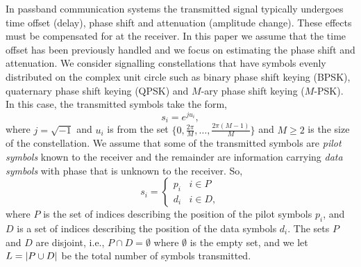 \documentclass[journal]{IEEEtran}
\begin{document}
In passband communication systems the transmitted signal typically undergoes time offset (delay), phase shift and attenuation (amplitude change).  These effects must be compensated for at the receiver. In this paper we assume that the time offset has been previously handled and we focus on estimating the phase shift and attenuation.  We consider signalling constellations that have symbols evenly distributed on the complex unit circle such as binary phase shift keying (BPSK), quaternary phase shift keying (QPSK) and $M$-ary phase shift keying ($M$-PSK).  In this case, the transmitted symbols take the form,
\[
s_i = e^{j u_i},
\]
where $j = \sqrt{-1}$ and $u_i$ is from the set $\{0, \tfrac{2\pi}{M}, \dots, \tfrac{2\pi(M-1)}{M}\}$ and $M \geq 2$ is the size of the constellation.  We assume that some of the transmitted symbols are \emph{pilot symbols} known to the receiver and the remainder are information carrying \emph{data symbols} with phase that is unknown to the receiver.  So,
\[
s_i = \begin{cases}
p_i & i \in P \\
d_i & i \in D,
\end{cases}
\]
where $P$ is the set of indices describing the position of the pilot symbols $p_i$, and $D$ is a set of indices describing the position of the data symbols $d_i$.  The sets $P$ and $D$ are disjoint, i.e., $P \cap D = \emptyset$  where $\emptyset$ is the empty set, and we let $L = {\left\vert P \cup D \right\vert}$ be the total number of symbols transmitted.
\end{document}
